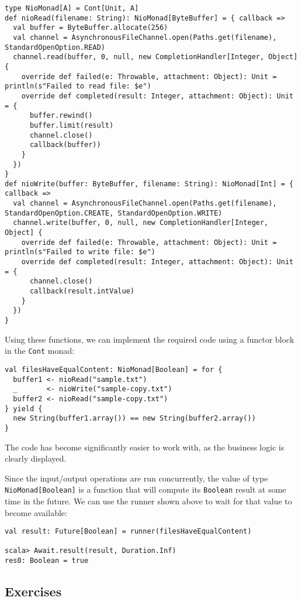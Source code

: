 \begin{lstlisting}
type NioMonad[A] = Cont[Unit, A]
def nioRead(filename: String): NioMonad[ByteBuffer] = { callback =>
  val buffer = ByteBuffer.allocate(256)
  val channel = AsynchronousFileChannel.open(Paths.get(filename), StandardOpenOption.READ)
  channel.read(buffer, 0, null, new CompletionHandler[Integer, Object] {
    override def failed(e: Throwable, attachment: Object): Unit = println(s"Failed to read file: $e")
    override def completed(result: Integer, attachment: Object): Unit = {
      buffer.rewind()
      buffer.limit(result)
      channel.close()
      callback(buffer))
    }
  })
}
def nioWrite(buffer: ByteBuffer, filename: String): NioMonad[Int] = { callback =>
  val channel = AsynchronousFileChannel.open(Paths.get(filename), StandardOpenOption.CREATE, StandardOpenOption.WRITE) 
  channel.write(buffer, 0, null, new CompletionHandler[Integer, Object] {
    override def failed(e: Throwable, attachment: Object): Unit = println(s"Failed to write file: $e")
    override def completed(result: Integer, attachment: Object): Unit = {
      channel.close()
      callback(result.intValue)
    }
  })
}
\end{lstlisting}
Using these functions, we can implement the required code using a
functor block in the \lstinline!Cont! monad:
\begin{lstlisting}
val filesHaveEqualContent: NioMonad[Boolean] = for {
  buffer1 <- nioRead("sample.txt")
  _       <- nioWrite("sample-copy.txt")
  buffer2 <- nioRead("sample-copy.txt")
} yield {
  new String(buffer1.array()) == new String(buffer2.array())
}
\end{lstlisting}
The code has become significantly easier to work with, as the business
logic is clearly displayed.

Since the input/output operations are run concurrently, the value
of type \lstinline!NioMonad[Boolean]! is a function that will compute
its \lstinline!Boolean! result at some time in the future. We can
use the runner shown above to wait for that value to become available:
\begin{lstlisting}
val result: Future[Boolean] = runner(filesHaveEqualContent)

scala> Await.result(result, Duration.Inf)
res0: Boolean = true
\end{lstlisting}


\subsection{Exercises}

